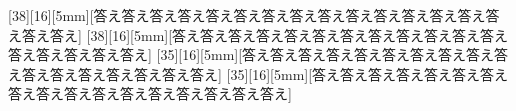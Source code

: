 \documentclass[8pt,b5paper,twoside]{ltjsreport}
\begin{document}
[38][16][5mm][答え答え答え答え答え答え答え答え答え答え答え答え答え答え答え答え答え]
\vskip0pt
[38][16][5mm][答え答え答え答え答え答え答え答え答え答え答え答え答え答え答え答え答え]
\vskip0pt
[35][16][5mm][答え答え答え答え答え答え答え答え答え答え答え答え答え答え答え答え答え]
\vskip0pt
[35][16][5mm][答え答え答え答え答え答え答え答え答え答え答え答え答え答え答え答え答え]
\end{document}
